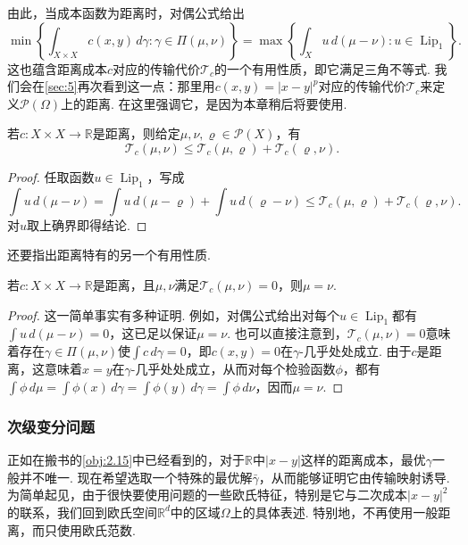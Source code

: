 由此，当成本函数为距离时，对偶公式给出
\begin{equation}\label{eq:3.1}
\min\left\{\int_{X\times X}c(x,y)\,d\gamma:\gamma\in\Pi(\mu,\nu)\right\}
=\max\left\{\int_Xu\,d(\mu-\nu):u\in\operatorname{Lip}_1\right\}.
\end{equation}
这也蕴含距离成本$c$对应的传输代价$\mathscr T_c$的一个有用性质，即它满足三角不等式. 我们会在\autoref{sec:5}再次看到这一点：那里用$c(x,y)=|x-y|^p$对应的传输代价$\mathscr T_c$来定义$\mathscr P(\Omega)$上的距离. 在这里强调它，是因为本章稍后将要使用.

\begin{corollary}\label{obj:3.2}
若$c:X\times X\to\mathbb R$是距离，则给定$\mu,\nu,\varrho\in\mathscr P(X)$，有
\[
\mathscr T_c(\mu,\nu)\le\mathscr T_c(\mu,\varrho)+\mathscr T_c(\varrho,\nu).
\]
\end{corollary}
\begin{proof}
任取函数$u\in\operatorname{Lip}_1$，写成
\[
\int u\,d(\mu-\nu)=\int u\,d(\mu-\varrho)+\int u\,d(\varrho-\nu)
\le\mathscr T_c(\mu,\varrho)+\mathscr T_c(\varrho,\nu).
\]
对$u$取上确界即得结论.
\end{proof}

还要指出距离特有的另一个有用性质.
\begin{corollary}\label{obj:3.3}
若$c:X\times X\to\mathbb R$是距离，且$\mu,\nu$满足$\mathscr T_c(\mu,\nu)=0$，则$\mu=\nu$.
\end{corollary}
\begin{proof}
这一简单事实有多种证明. 例如，对偶公式给出对每个$u\in\operatorname{Lip}_1$都有$\int u\,d(\mu-\nu)=0$，这已足以保证$\mu=\nu$. 也可以直接注意到，$\mathscr T_c(\mu,\nu)=0$意味着存在$\gamma\in\Pi(\mu,\nu)$使$\int c\,d\gamma=0$，即$c(x,y)=0$在$\gamma$-几乎处处成立. 由于$c$是距离，这意味着$x=y$在$\gamma$-几乎处处成立，从而对每个检验函数$\phi$，都有$\int\phi\,d\mu=\int\phi(x)\,d\gamma=\int\phi(y)\,d\gamma=\int\phi\,d\nu$，因而$\mu=\nu$.
\end{proof}

\subsubsection{次级变分问题}\label{sec:3.1.2}
正如在搬书的\autoref{obj:2.15}中已经看到的，对于$\mathbb R$中$|x-y|$这样的距离成本，最优$\gamma$一般并不唯一. 现在希望选取一个特殊的最优解$\bar\gamma$，从而能够证明它由传输映射诱导. 为简单起见，由于很快要使用问题的一些欧氏特征，特别是它与二次成本$|x-y|^2$的联系，我们回到欧氏空间$\mathbb R^d$中的区域$\Omega$上的具体表述. 特别地，不再使用一般距离，而只使用欧氏范数.

